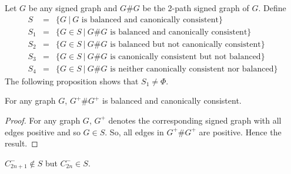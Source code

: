 Let $G$ be any signed graph and $G\# G$ be the 2-path signed graph of $G$.
Define 
\begin{eqnarray*}
S&=&\{G~|~G \text{ is balanced and canonically consistent}\}\\
S_1&=&\{G\in S~|~G\# G \text{ is balanced and canonically consistent}\}\\
S_2&=&\{G\in S~|~G\# G \text{ is balanced but not canonically consistent}\}\\
S_3&=&\{G\in S~|~G\# G \text{ is canonically consistent but not balanced}\}\\
S_4&=&\{G\in S~|~G\# G \text{ is neither canonically consistent nor balanced}\} 
\end{eqnarray*}
The following proposition shows that $S_1\neq\Phi$.
\begin{proposition}
 For any graph $G$, $G^+\# G^+$ is balanced and canonically consistent.
\end{proposition}
\begin{proof}
 For any graph $G$, $G^+$ denotes the corresponding signed graph with all edges positive and so $G\in S$. So,  all edges in $G^+\# G^+$
 are positive. Hence the result.
\end{proof}
\remark $C^-_{2n+1}\not\in S$ but $C^-_{2n}\in S$.


